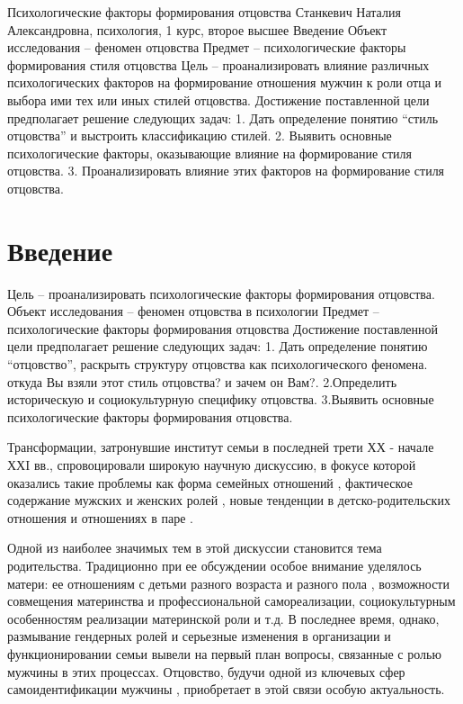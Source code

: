 \documentclass{../../common/thesisbyxetex}
\begin{document}
 
 Психологические факторы формирования отцовства
Станкевич Наталия Александровна,
психология, 1 курс, второе высшее
Введение
Объект исследования – феномен отцовства
Предмет – психологические факторы формирования стиля отцовства
Цель – проанализировать влияние различных психологических факторов на формирование отношения мужчин 
к роли отца и выбора ими тех или иных стилей отцовства. 
Достижение поставленной цели предполагает решение следующих задач:
1. Дать определение понятию “стиль отцовства” и выстроить классификацию стилей.
2. Выявить основные психологические факторы, оказывающие влияние на формирование стиля отцовства.
3. Проанализировать влияние этих факторов на формирование стиля отцовства.


\section*{Введение} 

Цель – проанализировать психологические факторы формирования отцовства.
Объект исследования – феномен отцовства в психологии
Предмет – психологические факторы формирования отцовства
Достижение поставленной цели предполагает решение следующих задач:
1. Дать определение понятию “отцовство”, раскрыть структуру отцовства как психологического феномена.
откуда Вы взяли этот стиль отцовства? и зачем он Вам?.
2.Определить историческую и социокультурную специфику отцовства.
3.Выявить основные психологические факторы формирования отцовства.

Трансформации, затронувшие институт семьи в последней трети ХХ - начале ХХI вв.,  спровоцировали
широкую научную дискуссию, в фокусе которой оказались такие проблемы как форма семейных
отношений \cite{gay, legfat}, фактическое содержание мужских и женских ролей \cite{mercoh, percep},
новые тенденции в детско-родительских отношения и отношениях в паре \cite{relot, sex}.

Одной из наиболее значимых тем в этой дискуссии становится тема родительства. Традиционно при ее
обсуждении особое внимание уделялось матери: ее отношениям с детьми разного возраста и разного
пола \cite{maler}, возможности совмещения материнства и профессиональной самореализации,
социокультурным особенностям реализации материнской роли и т.д. В последнее время, однако,
размывание гендерных ролей и серьезные изменения в организации и функционировании семьи
вывели на первый план вопросы, связанные с ролью мужчины в этих процессах. Отцовство, будучи одной
из ключевых сфер самоидентификации мужчины \cite{imaf}, приобретает в этой связи особую
актуальность.
\end{document}
